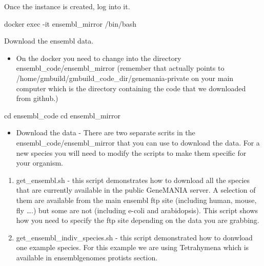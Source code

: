 \documentclass[]{book}
\newenvironment{Shaded}{\begin{snugshade}}{\end{snugshade}}
\newcommand{\BuiltInTok}[1]{#1}
\newcommand{\ExtensionTok}[1]{#1}
\newcommand{\NormalTok}[1]{#1}
\providecommand{\tightlist}{%
  \setlength{\itemsep}{0pt}\setlength{\parskip}{0pt}}
\begin{document}
Once the instance is created, log into it.

\begin{Shaded}
\begin{Highlighting}[]
\ExtensionTok{docker}\NormalTok{ exec -it ensembl_mirror /bin/bash}
\end{Highlighting}
\end{Shaded}

Download the ensembl data.

\begin{itemize}
\tightlist
\item
  On the docker you need to change into the directory
  ensembl\_code/ensembl\_mirror (remember that actually points to
  /home/gmbuild/gmbuild\_code\_dir/genemania-private on your main
  computer which is the directory containing the code that we downloaded
  from github.)
\end{itemize}

\begin{Shaded}
\begin{Highlighting}[]
\BuiltInTok{cd}\NormalTok{ ensembl_code}
\BuiltInTok{cd}\NormalTok{ ensembl_mirror}
\end{Highlighting}
\end{Shaded}

\begin{itemize}
\tightlist
\item
  Download the data - There are two separate scrits in the
  ensembl\_code/ensembl\_mirror that you can use to download the data.
  For a new species you will need to modify the scripts to make them
  specific for your organism.
\end{itemize}

\begin{enumerate}
\def\labelenumi{\arabic{enumi}.}
\tightlist
\item
  get\_ensembl.sh - this script demonstrates how to download all the
  species that are currently available in the public GeneMANIA server. A
  selection of them are available from the main ensembl ftp site
  (including human, mouse, fly \ldots{}.) but some are not (including
  e-coli and arabidopsis). This script shows how you need to specify the
  ftp site depending on the data you are grabbing.
\item
  get\_ensembl\_indiv\_species.sh - this script demonstrated how to
  donwload one example species. For this example we are using
  Tetrahymena which is available in ensemblgenomes protists section.
\end{enumerate}
\end{document}
